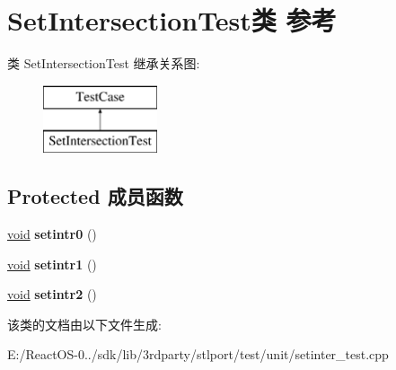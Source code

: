 \hypertarget{class_set_intersection_test}{}\section{Set\+Intersection\+Test类 参考}
\label{class_set_intersection_test}
类 Set\+Intersection\+Test 继承关系图\+:\begin{figure}[H]
\begin{center}
\leavevmode
\includegraphics[height=2.000000cm]{class_set_intersection_test}
\end{center}
\end{figure}
\subsection*{Protected 成员函数}
\begin{DoxyCompactItemize}
\item 
\mbox{\label{class_set_intersection_test_ad677041f716a145b7d51807ae787d050}} 
\hyperlink{interfacevoid}{void} {\bfseries setintr0} ()
\item 
\mbox{\label{class_set_intersection_test_a76425bf04a38e7809639b98a7f46dd42}} 
\hyperlink{interfacevoid}{void} {\bfseries setintr1} ()
\item 
\mbox{\label{class_set_intersection_test_a7cfdf3f291ac7f8979025c390f692fd4}} 
\hyperlink{interfacevoid}{void} {\bfseries setintr2} ()
\end{DoxyCompactItemize}


该类的文档由以下文件生成\+:\begin{DoxyCompactItemize}
\item 
E\+:/\+React\+O\+S-\/0../sdk/lib/3rdparty/stlport/test/unit/setinter\+\_\+test.\+cpp\end{DoxyCompactItemize}
